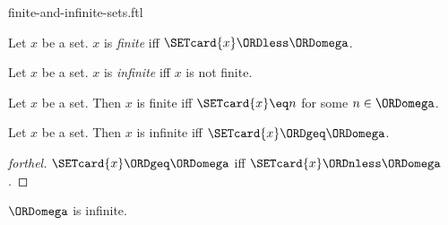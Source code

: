 \documentclass{naproche-library}
\begin{document}
\begin{smodule}[title=Finite and Infinite Sets]{finite-and-infinite-sets.ftl}

\begin{definition}[forthel,id=SET_THEORY_07_5346658235711488]
  Let $x$ be a set.
  $x$ is \emph{finite} iff $\SETcard{x} \ORDless \ORDomega$.
\end{definition}

\begin{definition}[forthel,id=SET_THEORY_07_8295412068777984]
  Let $x$ be a set.
  $x$ is \emph{infinite} iff $x$ is not finite.
\end{definition}

\begin{proposition}[forthel,id=SET_THEORY_07_3806229474312192]
  Let $x$ be a set.
  Then $x$ is finite iff $\SETcard{x} \eq n$ for some $n \in \ORDomega$.
\end{proposition}

\begin{proposition}[forthel,id=SET_THEORY_07_3174577070931968]
  Let $x$ be a set.
  Then $x$ is infinite iff $\SETcard{x} \ORDgeq \ORDomega$.
\end{proposition}
\begin{proof}[forthel]
  $\SETcard{x} \ORDgeq \ORDomega$ iff $\SETcard{x} \ORDnless \ORDomega$.
\end{proof}

\begin{proposition}[forthel,id=SET_THEORY_07_9154385075632368]
  $\ORDomega$ is infinite.
\end{proposition}
\end{smodule}
\end{document}
